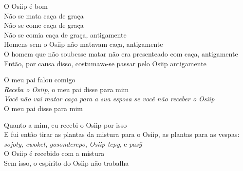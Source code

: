 \begin{linenumbers}\begingroup\raggedright
 
\noindent O Osiip é bom\\
 Não se mata caça de graça\\
 Não se come caça de graça\\
 Não se comia caça de graça, antigamente\\
 Homens sem o Osiip não matavam caça, antigamente\\
 O homem que não soubesse matar não era presenteado com caça, antigamente\\
 Então, por causa disso, costumava-se passar pelo Osiip antigamente
 
\end{linenumbers}\endgroup

\bigskip

\begin{linenumbers}\begingroup\raggedright
 
\noindent O meu pai falou comigo\\
 \emph{Receba o Osiip}, o meu pai disse para mim\\
 \emph{Você não vai matar caça para a sua esposa se você não receber o Osiip}\\
 O meu pai disse para mim
 
\end{linenumbers}\endgroup

\bigskip

\begin{linenumbers}\begingroup\raggedright
 
\noindent Quanto a mim, eu recebi o Osiip por isso\\
 E fui então tirar as plantas da mistura para o Osiip, as plantas para as vespas: \emph{sojoty,} \emph{ewoket}, \emph{gosonderepo}, \emph{Osiip tepy}, e \emph{pasỹ} \\
 O Osiip é recebido com a mistura\\
 Sem isso, o espírito do Osiip não trabalha
 
\end{linenumbers}\endgroup

